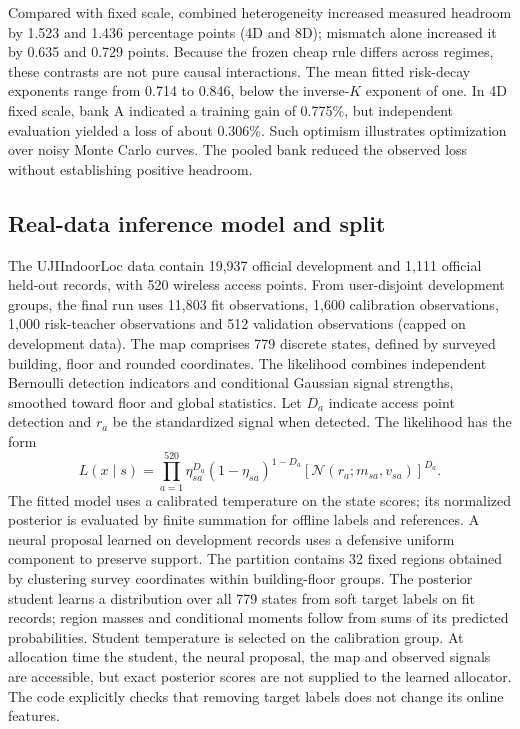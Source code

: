 \documentclass[10pt,letterpaper]{article}
\begin{document}
Compared with fixed scale, combined heterogeneity increased measured headroom by 1.523 and 1.436 percentage points (4D and 8D); mismatch alone increased it by 0.635 and 0.729 points. Because the frozen cheap rule differs across regimes, these contrasts are not pure causal interactions. The mean fitted risk-decay exponents range from 0.714 to 0.846, below the inverse-$K$ exponent of one. In 4D fixed scale, bank A indicated a training gain of 0.775\%, but independent evaluation yielded a loss of about 0.306\%. Such optimism illustrates optimization over noisy Monte Carlo curves. The pooled bank reduced the observed loss without establishing positive headroom.
\subsection{Real-data inference model and split}
The UJIIndoorLoc data contain 19,937 official development and 1,111 official held-out records, with 520 wireless access points. From user-disjoint development groups, the final run uses 11,803 fit observations, 1,600 calibration observations, 1,000 risk-teacher observations and 512 validation observations (capped on development data). The map comprises 779 discrete states, defined by surveyed building, floor and rounded coordinates. The likelihood combines independent Bernoulli detection indicators and conditional Gaussian signal strengths, smoothed toward floor and global statistics. Let $D_a$ indicate access point detection and $r_a$ be the standardized signal when detected. The likelihood has the form
\begin{equation}
 L(x\mid s)=\prod_{a=1}^{520} \eta_{sa}^{D_a}(1-\eta_{sa})^{1-D_a}\left[\mathcal N(r_a;m_{sa},v_{sa})\right]^{D_a}.
\end{equation}
The fitted model uses a calibrated temperature on the state scores; its normalized posterior is evaluated by finite summation for offline labels and references. A neural proposal learned on development records uses a defensive uniform component to preserve support. The partition contains 32 fixed regions obtained by clustering survey coordinates within building-floor groups. The posterior student learns a distribution over all 779 states from soft target labels on fit records; region masses and conditional moments follow from sums of its predicted probabilities. Student temperature is selected on the calibration group. At allocation time the student, the neural proposal, the map and observed signals are accessible, but exact posterior scores are not supplied to the learned allocator. The code explicitly checks that removing target labels does not change its online features.
\end{document}
